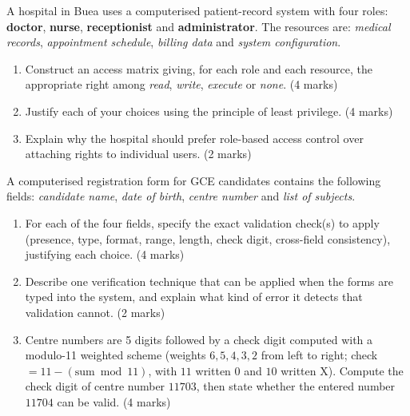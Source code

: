 \documentclass[11pt]{article}
\newcounter{popsec}
\newcounter{popsub}
\newcommand{\courssub}[1]{%
  \stepcounter{popsub}%
  \par\vspace{9pt}\noindent{\popxbold\fontsize{11.5}{13}\selectfont\color{popink}{\color{poporange}\thepopsec.\thepopsub}\hspace{6pt}#1}\par\nopagebreak\vspace{4pt}
}
\begin{document}
\courssub{I prepare for the GCE}

\begin{exercice}
A hospital in Buea uses a computerised patient-record system with four roles: \textbf{doctor}, \textbf{nurse}, \textbf{receptionist} and \textbf{administrator}. The resources are: \emph{medical records}, \emph{appointment schedule}, \emph{billing data} and \emph{system configuration}.
\begin{enumerate}
\item Construct an access matrix giving, for each role and each resource, the appropriate right among \emph{read}, \emph{write}, \emph{execute} or \emph{none}. \hfill (4 marks)
\item Justify each of your choices using the principle of least privilege. \hfill (4 marks)
\item Explain why the hospital should prefer role-based access control over attaching rights to individual users. \hfill (2 marks)
\end{enumerate}
\end{exercice}

\begin{exercice}
A computerised registration form for GCE candidates contains the following fields: \emph{candidate name}, \emph{date of birth}, \emph{centre number} and \emph{list of subjects}.
\begin{enumerate}
\item For each of the four fields, specify the exact validation check(s) to apply (presence, type, format, range, length, check digit, cross-field consistency), justifying each choice. \hfill (4 marks)
\item Describe one verification technique that can be applied when the forms are typed into the system, and explain what kind of error it detects that validation cannot. \hfill (2 marks)
\item Centre numbers are 5 digits followed by a check digit computed with a modulo-11 weighted scheme (weights $6,5,4,3,2$ from left to right; check $= 11 - (\text{sum} \bmod 11)$, with $11$ written $0$ and $10$ written X). Compute the check digit of centre number $11703$, then state whether the entered number $11704$ can be valid. \hfill (4 marks)
\end{enumerate}
\end{exercice}
\end{document}
